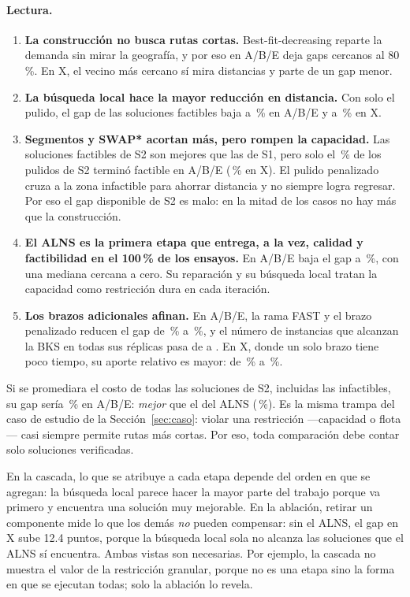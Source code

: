 \documentclass[11pt,a4paper]{article}
\begin{document}
\paragraph{Lectura.}
\begin{enumerate}[leftmargin=1.5em]
\item \textbf{La construcción no busca rutas cortas.} Best-fit-decreasing reparte la demanda sin
mirar la geografía, y por eso en A/B/E deja gaps cercanos al 80\,\%. En X, el vecino más cercano sí
mira distancias y parte de un gap menor.
\item \textbf{La búsqueda local hace la mayor reducción en distancia.} Con solo el pulido, el gap de
las soluciones factibles baja a \cgfABEb\,\% en A/B/E y a \cgfXb\,\% en X.
\item \textbf{Segmentos y SWAP* acortan más, pero rompen la capacidad.} Las soluciones factibles de S2
son mejores que las de S1, pero solo el \cfeABEc\,\% de los pulidos de S2 terminó factible en A/B/E
(\cfeXc\,\% en X). El pulido penalizado cruza a la zona infactible para ahorrar distancia y no
siempre logra regresar. Por eso el gap disponible de S2 es malo: en la mitad de los casos no hay más
que la construcción.
\item \textbf{El ALNS es la primera etapa que entrega, a la vez, calidad y factibilidad en el 100\,\%
de los ensayos.} En A/B/E baja el gap a \cgABEd\,\%, con una mediana cercana a cero. Su reparación y su
búsqueda local tratan la capacidad como restricción dura en cada iteración.
\item \textbf{Los brazos adicionales afinan.} En A/B/E, la rama FAST y el brazo penalizado reducen el
gap de \cgABEd\,\% a \cgABEf\,\%, y el número de instancias que alcanzan la BKS en todas sus réplicas
pasa de \cbABEd{} a \cbABEf{}. En X, donde un solo brazo tiene poco tiempo, su aporte relativo es
mayor: de \cgXd\,\% a \cgXf\,\%.
\end{enumerate}

\begin{leccion}
Si se promediara el costo de todas las soluciones de S2, incluidas las infactibles, su gap sería
\cgrABEc\,\% en A/B/E: \emph{mejor} que el del ALNS (\cgABEd\,\%). Es la misma trampa del caso de estudio de
la Sección~\ref{sec:caso}: violar una restricción ---capacidad o flota--- casi siempre permite rutas
más cortas. Por eso, toda comparación debe contar solo soluciones verificadas.
\end{leccion}

\begin{leccion}
En la cascada, lo que se atribuye a cada etapa depende del orden en que se agregan: la búsqueda local
parece hacer la mayor parte del trabajo porque va primero y encuentra una solución muy mejorable.
En la ablación, retirar un componente mide lo que los demás \emph{no} pueden compensar: sin el ALNS,
el gap en X sube 12.4 puntos, porque la búsqueda local sola no alcanza las soluciones que el ALNS sí
encuentra. Ambas vistas son necesarias. Por ejemplo, la cascada no muestra el valor de la
restricción granular, porque no es una etapa sino la forma en que se ejecutan todas; solo la ablación
lo revela.
\end{leccion}
\end{document}

